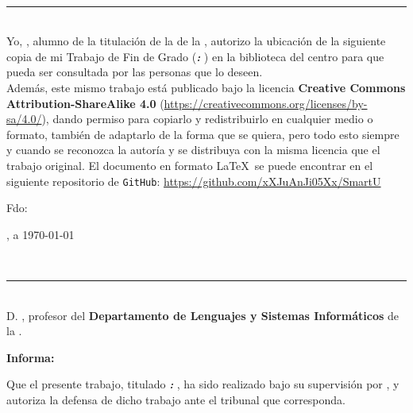 {{\newpage
\thispagestyle{empty}
\
\vspace{3cm}

\noindent\rule[-1ex]{\textwidth}{2pt}\\[4.5ex]

Yo, \textbf{\autor}, alumno de la titulación \textbf{\grado} de la \textbf{\escuela} de la \textbf{\universidad}, autorizo la ubicación de la siguiente copia de mi Trabajo de Fin de Grado (\textbf{\textit{\titulo: \subtitulo}}) en la biblioteca del centro para que pueda ser consultada por las personas que lo deseen. \\

Además, este mismo trabajo está publicado bajo la licencia \textbf{Creative Commons Attribution-ShareAlike 4.0} (\url{https://creativecommons.org/licenses/by-sa/4.0/}), dando permiso para copiarlo y redistribuirlo en cualquier medio o formato, también de adaptarlo de la forma que se quiera, pero todo esto siempre y cuando se reconozca la autoría y se distribuya con la misma licencia que el trabajo original. El documento en formato \LaTeX\ se puede encontrar en el siguiente repositorio de {\tt GitHub}: \url{https://github.com/xXJuAnJi05Xx/SmartU}

\vspace{4cm}

\noindent Fdo: \autor

\vspace{2cm}

\begin{flushright}
\ciudad, a \today
\end{flushright}

\newpage
\thispagestyle{empty}
\
\vspace{3cm}

\noindent\rule[-1ex]{\textwidth}{2pt}\\[4.5ex]

D. \textbf{\tutor}, profesor del \textbf{Departamento de Lenguajes y Sistemas Informáticos} de la \textbf{\universidad}.

\vspace{0.5cm}

\textbf{Informa:}

\vspace{0.5cm}

Que el presente trabajo, titulado \textit{\textbf{\titulo: \subtitulo}}, ha sido realizado bajo su supervisión por \textbf{\autor}, y autoriza la defensa de dicho trabajo ante el tribunal que corresponda.

\vspace{0.5cm}

}}
